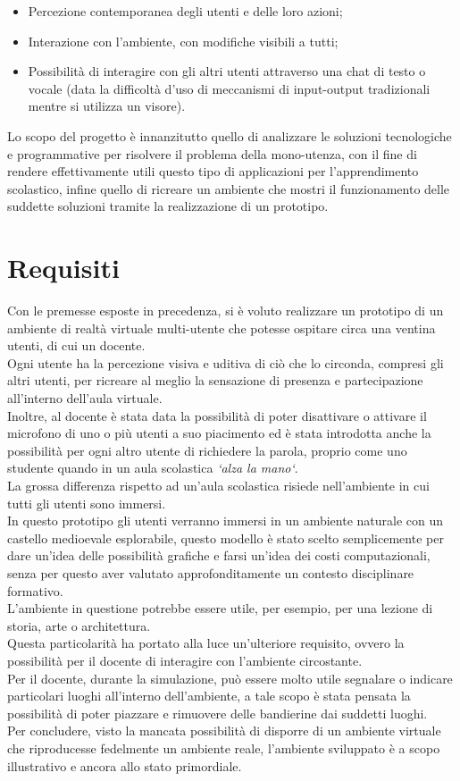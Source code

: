 \begin{itemize}
    \item Percezione contemporanea degli utenti e delle loro azioni;
    \item Interazione con l'ambiente, con modifiche visibili a tutti;
    \item Possibilità di interagire con gli altri utenti attraverso una chat di testo o vocale (data la difficoltà d’uso di meccanismi di input-output tradizionali mentre si utilizza un visore).
\end{itemize}
Lo scopo del progetto è innanzitutto quello di analizzare le soluzioni tecnologiche e programmative per risolvere il problema della mono-utenza, con il fine di rendere effettivamente utili questo tipo di applicazioni per l'apprendimento scolastico, infine quello di ricreare un ambiente che mostri il funzionamento delle suddette soluzioni tramite la realizzazione di un prototipo.
\section{Requisiti}
Con le premesse esposte in precedenza, si è voluto realizzare un prototipo di un ambiente di realtà virtuale multi-utente che potesse ospitare circa una ventina utenti, di cui un docente.
\\Ogni utente ha la percezione visiva e uditiva di ciò che lo circonda, compresi gli altri utenti, per ricreare al meglio la sensazione di presenza e partecipazione all'interno dell'aula virtuale.
\\Inoltre, al docente è stata data la possibilità di poter disattivare o attivare il microfono di uno o più utenti a suo piacimento ed è stata introdotta anche la possibilità per ogni altro utente di richiedere la parola, proprio come uno studente quando in un aula scolastica \textit{`alza la mano`}.
\\La grossa differenza rispetto ad un'aula scolastica risiede nell'ambiente in cui tutti gli utenti sono immersi. 
\\In questo prototipo gli utenti verranno immersi in un ambiente naturale con un castello medioevale esplorabile, questo modello è stato scelto semplicemente per dare un’idea delle possibilità grafiche e farsi un’idea dei costi computazionali, senza per questo aver valutato approfonditamente un contesto disciplinare formativo.
\\L'ambiente in questione potrebbe essere utile, per esempio, per una lezione di storia, arte o architettura.
\\Questa particolarità ha portato alla luce un'ulteriore requisito, ovvero la possibilità per il docente di interagire con l'ambiente circostante.
\\Per il docente, durante la simulazione, può essere molto utile segnalare o indicare particolari luoghi all'interno dell'ambiente, a tale scopo è stata pensata la possibilità di poter piazzare e rimuovere delle bandierine dai suddetti luoghi.
\\Per concludere, visto la mancata possibilità di disporre di un ambiente virtuale che riproducesse fedelmente un ambiente reale, l'ambiente sviluppato è a scopo illustrativo e ancora allo stato primordiale.
